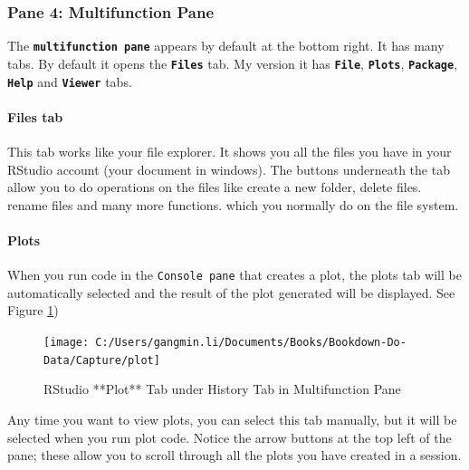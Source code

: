 \documentclass[
]{book}
\begin{document}
\hypertarget{pane-4-multifunction-pane}{%
\subsubsection*{Pane 4: Multifunction Pane}\label{pane-4-multifunction-pane}}


The \textbf{\texttt{multifunction\ pane}} appears by default at the bottom right. It has many tabs. By default it opens the \textbf{\texttt{Files}} tab. My version it has \textbf{\texttt{File}}, \textbf{\texttt{Plots}}, \textbf{\texttt{Package}}, \textbf{\texttt{Help}} and \textbf{\texttt{Viewer}} tabs.

\hypertarget{files-tab}{%
\paragraph{\texorpdfstring{\textbf{Files tab}}{Files tab}}\label{files-tab}}

This tab works like your file explorer. It shows you all the files you have in your RStudio account (your document in windows). The buttons underneath the tab allow you to do operations on the files like create a new folder, delete files. rename files and many more functions. which you normally do on the file system.

\hypertarget{plots}{%
\paragraph{\texorpdfstring{\textbf{Plots}}{Plots}}\label{plots}}

When you run code in the \texttt{Console\ pane} that creates a plot, the plots tab will be automatically selected and the result of the plot generated will be displayed. See Figure \ref{fig:plot})

\begin{figure}

{\centering \texttt{[image: C:/Users/gangmin.li/Documents/Books/Bookdown-Do-Data/Capture/plot]} 

}

\caption{RStudio **Plot** Tab under History Tab in Multifunction Pane}\label{fig:plot}
\end{figure}

Any time you want to view plots, you can select this tab manually, but it will be selected when you run plot code. Notice the arrow buttons at the top left of the pane; these allow you to scroll through all the plots you have created in a session.
\end{document}
